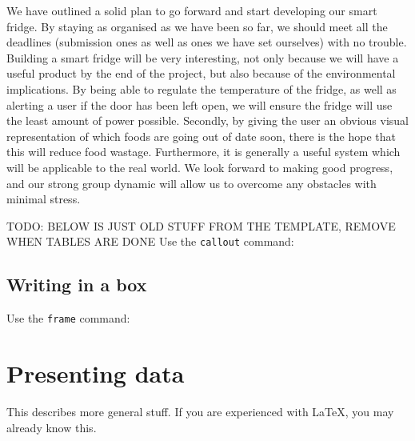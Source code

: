 \documentclass[10pt]{article}
\begin{document}
We have outlined a solid plan to go forward and start developing our smart fridge. By staying as organised as we have been so far, we should meet all the deadlines (submission ones as well as ones we have set ourselves) with no trouble. Building a smart fridge will be very interesting, not only because we will have a useful product by the end of the project, but also because of the environmental implications. By being able to regulate the temperature of the fridge, as well as alerting a user if the door has been left open, we will ensure the fridge will use the least amount of power possible. Secondly, by giving the user an obvious visual representation of which foods are going out of date soon, there is the hope that this will reduce food wastage. Furthermore, it is generally a useful system which will be applicable to the real world. We look forward to making good progress, and our strong group dynamic will allow us to overcome any obstacles with minimal stress.






\newpage
TODO: BELOW IS JUST OLD STUFF FROM THE TEMPLATE, REMOVE WHEN TABLES ARE DONE
Use the \texttt{callout} command:


\subsection{Writing in a box}

Use the \texttt{frame} command:


\section{Presenting data}

This describes more general stuff.  If you are experienced with \LaTeX, you may already know this.
\end{document}
